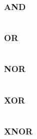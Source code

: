 \documentclass[11pt, english, numbers=endperiod]{scrartcl}
\begin{document}
\subsubsection{AND}
\inputminted[firstline=9, lastline=11 ,tabsize=4]{prolog}{gates.pl}

\subsubsection{OR}
\inputminted[firstline=19, lastline=22 ,tabsize=4]{prolog}{gates.pl}

\subsubsection{NOR}
\inputminted[firstline=13, lastline=17 ,tabsize=4]{prolog}{gates.pl}

\subsubsection{XOR}
\inputminted[firstline=24, lastline=28 ,tabsize=4]{prolog}{gates.pl}

\subsubsection{XNOR}
\inputminted[firstline=30, lastline=35 ,tabsize=4]{prolog}{gates.pl}
\end{document}
